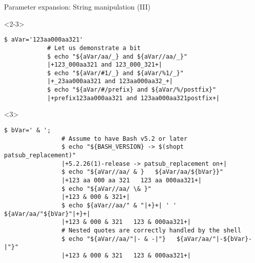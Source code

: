 \begin{frame}[fragile]{Parameter expansion: String manipulation (III)}
    \begin{onlyenv}<2-3>
        \vspace{-4mm}
        \begin{lstlisting}[style=MyBash, style=oddnumbers]
            $ aVar='123aa000aa321'
            # Let us demonstrate a bit
            $ echo "${aVar/aa/_} and ${aVar//aa/_}"
            |+123_000aa321 and 123_000_321+|
            $ echo "${aVar/#1/_} and ${aVar/%1/_}"
            |+_23aa000aa321 and 123aa000aa32_+|
            $ echo "${aVar/#/prefix} and ${aVar/%/postfix}"
            |+prefix123aa000aa321 and 123aa000aa321postfix+|
        \end{lstlisting}
        \begin{uncoverenv}<3>
            \begin{lstlisting}[style=MyBash, style=oddnumbers, aboveskip=2mm, firstnumber=8]
                $ bVar=' & ';
                # Assume to have Bash v5.2 or later
                $ echo "${BASH_VERSION} -> $(shopt patsub_replacement)"
                |+5.2.26(1)-release -> patsub_replacement on+|
                $ echo "${aVar//aa/ & }   ${aVar/aa/${bVar}}"
                |+123 aa 000 aa 321   123 aa 000aa321+|
                $ echo "${aVar//aa/ \& }"
                |+123 & 000 & 321+|
                $ echo ${aVar//aa/" & "|+}+| ' ' ${aVar/aa/"${bVar}"|+}+|
                |+123 & 000 & 321   123 & 000aa321+|
                # Nested quotes are correctly handled by the shell
                $ echo "${aVar//aa/"|- & -|"}   ${aVar/aa/"|-${bVar}-|"}"
                |+123 & 000 & 321   123 & 000aa321+|
            \end{lstlisting}
        \end{uncoverenv}
    \end{onlyenv}
\end{frame}
